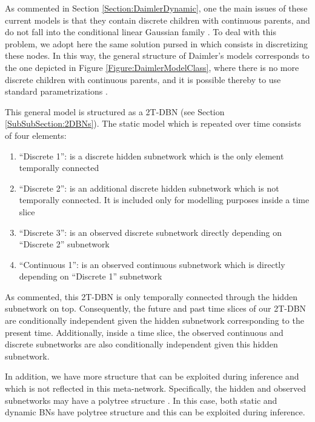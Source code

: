 As commented in Section \ref{Section:DaimlerDynamic}, one the main issues of these current models is that they contain discrete children with continuous parents, and do not fall into the conditional linear Gaussian family \cite{JensenNielsen2007}. To deal with this problem, we adopt here the same solution pursed in \cite{kasper2012object} which consists in discretizing these nodes. In this way, the general structure of Daimler's models corresponds to the one depicted in Figure \ref{Figure:DaimlerModelClass}, where there is no more discrete children with continuous parents, and it is possible thereby to use standard parametrizations \cite{JensenNielsen2007}. 


This general model is structured as a 2T-DBN (see Section \ref{SubSubSection:2DBNs}). The static model which is repeated over time consists of four elements: 

\begin{enumerate}
\item ``Discrete 1'': is a discrete hidden subnetwork which is the only element temporally connected
\item ``Discrete 2'': is an additional discrete hidden subnetwork which is not temporally connected. It is included only for modelling purposes inside a time slice
\item ``Discrete 3'': is an observed discrete subnetwork directly depending on ``Discrete 2'' subnetwork
\item  ``Continuous 1'': is an observed continuous subnetwork which is directly depending on ``Discrete 1'' subnetwork
\end{enumerate}

As commented, this 2T-DBN is only temporally connected through the hidden subnetwork on top. Consequently, the future and past time slices of our 2T-DBN are conditionally independent given the hidden subnetwork corresponding to the present time. Additionally, inside a time slice, the observed continuous and discrete subnetworks are also conditionally independent given this hidden subnetwork.

In addition, we have more structure that can be exploited during inference and which is not reflected in this meta-network. Specifically, the hidden and observed subnetworks may have a polytree structure \cite{JensenNielsen2007}. In this case, both static and dynamic BNs have polytree structure and this can be exploited during inference. 

